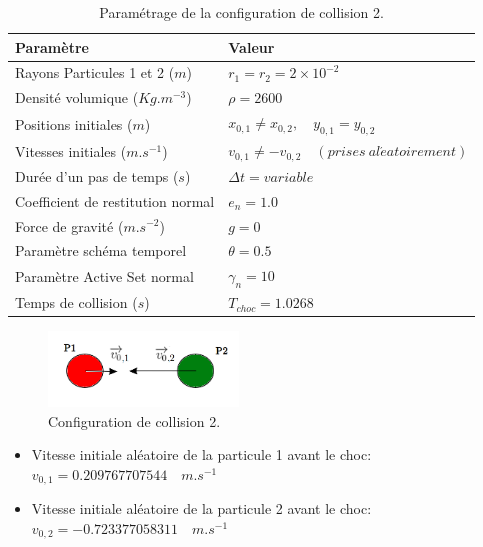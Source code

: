 \begin{center}
\begin{table}[!h]
\begin{tabular}{ |p{5.75cm}|p{6.8cm}| }
 \hline  \rowcolor{lightgray}

 Paramètre& Valeur\\
 \hline
 Rayons Particules 1 et 2  ($m$) & $r_1 = r_2 = 2\times10^{-2}$\\
 Densité volumique ($Kg.m^{-3}$)& $\rho = 2600$\\
 Positions initiales ($m$) & $x_{0,1} \neq x_{0,2}, \quad y_{0,1} = y_{0,2}$\\
 Vitesses initiales  ($m.s^{-1}$)  &$v_{0,1} \neq -v_{0,2} \quad (prises\ al\acute{e}atoirement)$\\
 Durée d'un pas de temps ($s$)&   $\Delta t = variable$\\
 Coefficient de restitution normal& $e_n = 1.0$\\
 Force de gravité ($m.s^{-2}$)& $g = 0$\\
 Paramètre schéma temporel & $\theta = 0.5$\\
 Paramètre Active Set normal &$\gamma_n = 10$\\
 Temps de collision ($s$)& $T_{choc} = 1.0268$\\
 \hline
\end{tabular}
\caption{Paramétrage de la configuration de collision 2.}\label{tab3}
\end{table}
\end{center}

\begin{figure}[!h]
  \centering
    \includegraphics[width=0.45\textwidth]{chapitres/chapitre_3/figures/same-radius_same-mass_diff-vel.png}
    \caption{Configuration de collision 2.}\label{conf2}
\end{figure}

\begin{itemize}
    \item Vitesse initiale aléatoire de la particule 1 avant le choc:\\ $v_{0,1} = 0.209767707544 \quad m.s^{-1} $ 
    \item Vitesse initiale aléatoire de la particule 2 avant le choc:\\ $v_{0,2} = -0.723377058311 \quad m.s^{-1} $
\end{itemize}

